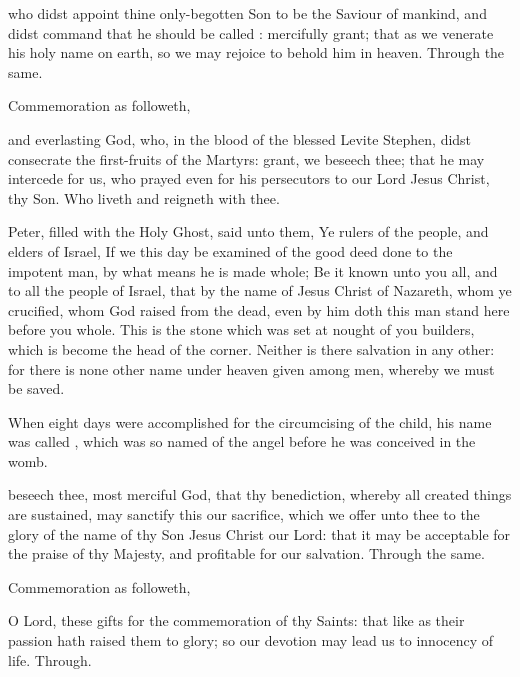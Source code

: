 \collect
{} who didst appoint thine only-begotten Son to be the Saviour of mankind, and didst command that he should be called : mercifully grant; that as we venerate his holy name on earth, so we may rejoice to behold him in heaven. Through the same.
\begin{rubric}
	Commemoration  as followeth,
\end{rubric}
 and everlasting God, who, in the blood of the blessed Levite Stephen, didst consecrate the first-fruits of the Martyrs: grant, we beseech thee; that he may intercede for us, who prayed even for his persecutors to our Lord Jesus Christ, thy Son. Who liveth and reigneth with thee.

 Peter, filled with the Holy Ghost, said unto them, Ye rulers of the people, and elders of Israel, If we this day be examined of the good deed done to the impotent man, by what means he is made whole; Be it known unto you all, and to all the people of Israel, that by the name of Jesus Christ of Nazareth, whom ye crucified, whom God raised from the dead, even by him doth this man stand here before you whole. This is the stone which was set at nought of you builders, which is become the head of the corner. Neither is there salvation in any other: for there is none other name under heaven given among men, whereby we must be saved.


 When eight days were accomplished for the circumcising of the child, his name was called , which was so named of the angel before he was conceived in the womb.

\secret
{} beseech thee, most merciful God, that thy benediction, whereby all created things are sustained, may sanctify this our sacrifice, which we offer unto thee to the glory of the name of thy Son Jesus Christ our Lord: that it may be acceptable for the praise of thy Majesty, and profitable for our salvation. Through the same.
\begin{rubric}
	Commemoration  as followeth,
\end{rubric}
 O Lord, these gifts for the commemoration of thy Saints: that like as their passion hath raised them to glory; so our devotion may lead us to innocency of life. Through.

